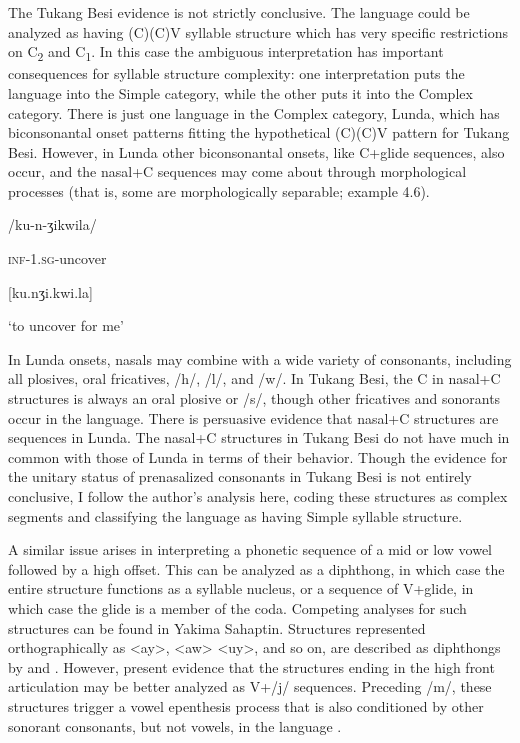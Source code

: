   The Tukang Besi evidence is not strictly conclusive. The language could be analyzed as having (C)(C)V syllable structure which has very specific restrictions on C\textsubscript{2} and C\textsubscript{1}. In this case the ambiguous interpretation has important consequences for syllable structure complexity: one interpretation puts the language into the Simple category, while the other puts it into the Complex category. There is just one language in the Complex category, Lunda, which has biconsonantal onset patterns fitting the hypothetical (C)(C)V pattern for Tukang Besi. However, in Lunda other biconsonantal onsets, like C+glide sequences, also occur, and the nasal+C sequences may come about through morphological processes (that is, some are morphologically separable; example 4.6).

\ea\label{ex:(4.6)}

/ku-n-ʒikwila/

\textsc{inf}-\textsc{1.sg}-uncover

[ku.nʒi.kwi.la]

\glt ‘to uncover for me’

\citep[24]{Kawasha2003}
\z

In Lunda onsets, nasals may combine with a wide variety of consonants, including all plosives, oral fricatives, /h/, /l/, and /w/. In Tukang Besi, the C in nasal+C structures is always an oral plosive or /s/, though other fricatives and sonorants occur in the language. There is persuasive evidence that nasal+C structures are sequences in Lunda. The nasal+C structures in Tukang Besi do not have much in common with those of Lunda in terms of their behavior. Though the evidence for the unitary status of prenasalized consonants in Tukang Besi is not entirely conclusive, I follow the author’s analysis here, coding these structures as complex segments and classifying the language as having Simple syllable structure. 

  A similar issue arises in interpreting a phonetic sequence of a mid or low vowel followed by a high offset. This can be analyzed as a diphthong, in which case the entire structure functions as a syllable nucleus, or a sequence of V+glide, in which case the glide is a member of the coda. Competing analyses for such structures can be found in Yakima Sahaptin. Structures represented orthographically as <ay>, <aw> <uy>, and so on, are described as diphthongs by \citet{Jansen2010} and \citet{RigsbyRude1996}. However, \citet{HargusBeavert2006} present evidence that the structures ending in the high front articulation may be better analyzed as V+/j/ sequences. Preceding /m/, these structures trigger a vowel epenthesis process that is also conditioned by other sonorant consonants, but not vowels, in the language .

